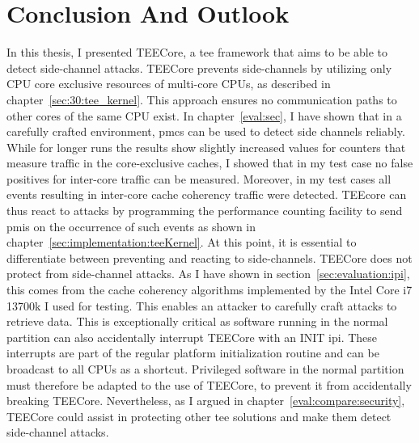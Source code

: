 \chapter{Conclusion And Outlook}
\label{sec:conclusion}



In this thesis, I presented TEECore, a \gls{tee} framework that aims to be able
to detect side-channel attacks. TEECore prevents side-channels by utilizing only
CPU core exclusive resources of multi-core CPUs, as described in
chapter~\ref{sec:30:tee_kernel}. This approach ensures no communication paths to
other cores of the same CPU exist. In chapter~\ref{eval:sec}, I have shown that
in a carefully crafted environment, \glspl{pmc} can be used to detect side
channels reliably. While for longer runs the results show slightly increased
values for counters that measure traffic in the core-exclusive caches, I showed
that in my test case no false positives for inter-core traffic can be measured.
Moreover, in my test cases all events resulting in inter-core cache coherency
traffic were detected. TEEcore can thus react to attacks by programming the
performance counting facility to send \glspl{pmi} on the occurrence of such
events as shown in chapter~\ref{sec:implementation:teeKernel}. At this point, it
is essential to differentiate between preventing and reacting to side-channels.
TEECore does not protect from side-channel attacks. As I have shown in
section~\ref{sec:evaluation:ipi}, this comes from the cache coherency algorithms
implemented by the Intel Core i7 13700k I used for testing. This enables an
attacker to carefully craft attacks to retrieve data. This is exceptionally
critical as software running in the normal partition can also accidentally
interrupt TEECore with an INIT \gls{ipi}. These interrupts are part of the
regular platform initialization routine and can be broadcast to all CPUs as a
shortcut. Privileged software in the normal partition must therefore be adapted
to the use of TEECore, to prevent it from accidentally breaking TEECore.
Nevertheless, as I argued in chapter~\ref{eval:compare:security}, TEECore could
assist in protecting other \gls{tee} solutions and make them detect side-channel
attacks. \\

